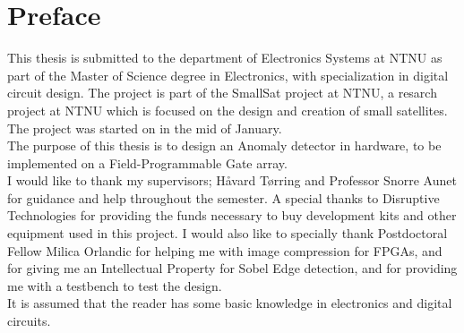 \newpage
\chapter*{Preface}




This thesis is submitted to the department of Electronics Systems at NTNU as part of the Master of Science degree in Electronics, with specialization in digital circuit design. The project is part of the SmallSat project at NTNU, a resarch project at NTNU which is focused on the design and creation of small satellites. The project was started on in the mid of January. 
\\

The purpose of this thesis is to design an Anomaly detector in hardware, to be implemented on a Field-Programmable Gate array. 
\\

I would like to thank my supervisors; Håvard Tørring and Professor Snorre Aunet for guidance and help throughout the semester. A special thanks to Disruptive Technologies for providing the funds necessary to buy development kits and other equipment used in this project. I would also like to specially thank Postdoctoral Fellow Milica Orlandic for helping me with image compression for FPGAs, and for giving me an Intellectual Property for Sobel Edge detection, and for providing me with a testbench to test the design. \\

It is assumed that the reader has some basic knowledge in electronics and digital circuits.